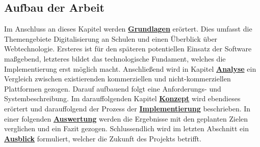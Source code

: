 \newpage

\subsection{Aufbau der Arbeit}
Im Anschluss an dieses Kapitel werden \hyperref[sec:grundlagen]{\textbf{Grundlagen}} erörtert. Dies umfasst die Themengebiete Digitalisierung an Schulen und einen Überblick über Webtechnologie. Ersteres ist für den späteren potentiellen Einsatz der Software maßgebend, letzteres bildet das technologische Fundament, welches die Implementierung erst möglich macht. Anschließend wird in Kapitel \hyperref[sec:analyse]{\textbf{Analyse}} ein Vergleich zwischen existierenden kommerziellen und nicht-kommerziellen Plattformen gezogen. Darauf aufbauend folgt eine Anforderungs- und Systembeschreibung. Im darauffolgenden Kapitel \hyperref[sec:konzept]{ \textbf{Konzept}} wird ebendieses erörtert und darauffolgend der Prozess der \hyperref[sec:implementierung]{\textbf{Implementierung}} beschrieben. In einer folgenden \hyperref[sec:auswertung]{\textbf{Auswertung}} werden die Ergebnisse mit den geplanten Zielen verglichen und ein Fazit gezogen. Schlussendlich wird im letzten Abschnitt ein \hyperref[sec:ausblick]{\textbf{Ausblick}} formuliert, welcher die Zukunft des Projekts betrifft. 
   

